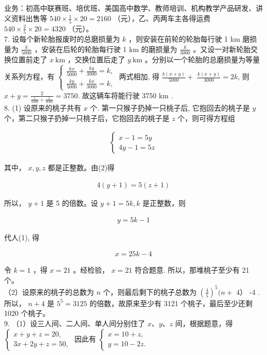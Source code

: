 \documentclass[10pt]{article}
\begin{document}
业务：初高中联赛班、培优班、美国高中数学、教师培训、机构教学产品研发、讲义资料出售等 $540 \times \frac{1}{5} \times 20=2160$ （元），乙、丙两车主各得运费 $540 \times \frac{2}{5} \times 20=4320$ （元）。\\
7. 设每个新轮胎报废时的总磨损量为 $k$ ，则安装在前轮的轮胎每行驶 1 km 磨损量为 $\frac{k}{5000}$ ，安装在后轮的轮胎每行驶 1 km 的磨损量为 $\frac{k}{3000}$ 。又设一对新轮胎交换位置前走了 $x \mathrm{~km}$ ，交换位置后走了 $y \mathrm{~km}$ 。分别以一个轮胎的总磨损量为等量关系列方程，有 $\left\{\begin{array}{l}\frac{k x}{5000}+\frac{k y}{3000}=k, \\ \frac{k y}{5000}+\frac{k x}{3000}=k,\end{array}\right.$ 两式相加, 得 $\frac{k(x+y)}{5000}+$ $\frac{k(x+y)}{3000}=2 k$, 则 $x+y=\frac{2}{\frac{1}{5000}+\frac{1}{3000}}=3750$. 故这辆车将能行驶 3750 km .\\
8. (1) 设原来的桃子共有 $x$ 个. 第一只猴子扔掉一只桃子后, 它抱回去的桃子是 $y$ 个，第二只猴子扔掉一只桃子后，它抱回去的桃子是 $z$ 个，则可得方程组

\begin{align*}
\left\{\begin{array}{l}
x-1=5 y  \tag{1}\\
4 y-1=5 z
\end{array}\right.
\end{align*}

其中， $x, y, z$ 都是正整数。由(2)得

\begin{align*}
4(y+1)=5(z+1) \tag{3}
\end{align*}

所以， $y+1$ 是 5 的倍数。设 $y+1=5 k, k$ 是正整数，则

\begin{align*}
y=5 k-1
\end{align*}

代人(1), 得

\begin{align*}
x=25 k-4
\end{align*}

令 $k=1$ ，得 $x=21$ 。经检验， $x=21$ 符合题意. 所以，那堆桃子至少有 21 个。\\
（2）设原来的桃子的总数为 $n$ 个，则最后剩下的桃子总数为 $\left(\frac{4}{5}\right)^{5}(n+$ 4） -4 . 所以， $n+4$ 是 $5^{5}=3125$ 的倍数，故原来至少有 3121 个桃子，最后至少还剩 1020 个桃子。\\
9. （1）设三人间、二人间、单人间分别住了 $x 、 y 、 z$ 间，根据题意，得 $\left\{\begin{array}{l}x+y+z=20, \\ 3 x+2 y+z=50,\end{array}\right.$ 因此有 $\left\{\begin{array}{l}x=10+z, \\ y=10-2 z .\end{array}\right.$
\end{document}
